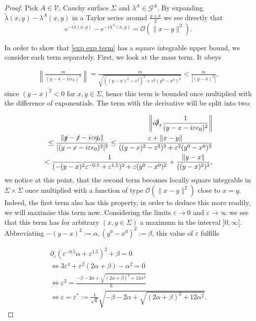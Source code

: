 \documentclass[b5paper,draft,openbib,12pt]{memoir}
\begin{document}
\begin{proof}
Pick \(A\in \mathcal{V}\), Cauchy surface \(\Sigma\) and \(\lambda^A\in \mathcal{G}^A\).
By expanding \(\tilde{\lambda}(x,y)-\lambda^A(x,y)\) in a Taylor series around \(\frac{y+x}{2}\) we see directly that
\begin{equation}\label{exp exp diff}
e^{-i\tilde{\lambda}(x,y)}-e^{-i\lambda^A(x,y)}=\mathcal{O}(\|x-y\|^2).
\end{equation}

In order to show that \eqref{exp exp term} has a square integrable upper bound, we consider each term separately.  First, we look at the mass term. 
It obeys

\begin{align}
\left\|\frac{m}{(y-x-i\varepsilon e_0)^2}\right\|= \frac{m}{\sqrt{((y-x)^2-\varepsilon^2)^2+\varepsilon^2(y^0-x^0)^2}}<\frac{m}{|(y-x)^2|},
\end{align}
since \((y-x)^2<0\) for \(x,y\in \Sigma\), hence this 
term is bounded once multiplied with the difference of 
exponentials.
The term with the derivative will be split into two:

\begin{align}
\left\| i\slashed{\partial}_x \frac{1}{(y-x-i\varepsilon e_0)^2} \right\|\\
\le \frac{\| \slashed{y}-\slashed{x}-i\varepsilon \slashed{e_0}\|}{| (y-x-i\varepsilon e_0)^2|^2}
\le \frac{\varepsilon + \|x-y\|}{((y-x)^2-\varepsilon^2)^2+\varepsilon^2 (y^0-x^0)^2}\\\label{eq:uglyterm}
<\frac{1}{(-(y-x)^2 \varepsilon^{-0.5}+\varepsilon^{1.5})^2+\varepsilon(y^0-x^0)^2} +\frac{\|y-x\|}{((y-x)^2)^2},
\end{align}
we notice at this point, that the second term becomes locally square integrable in \(\Sigma\times\Sigma\) 
once multiplied with a function of type \(\mathcal{O}(\|x-y\|^2)\) close to \(x=y\). Indeed, the first term also has this property, in order to
deduce this more readily, we will maximise this term now.  Considering the limits \(\varepsilon \rightarrow 0\) and \(\varepsilon \rightarrow \infty\)
we see that this term has for arbitrary \((x,y\in\Sigma)\) a maximum in the interval \(]0,\infty[\). 
Abbreviating \(-(y-x)^2:=\alpha, (y^0-x^0)^2:=\beta\), this value of \(\varepsilon\) fulfills

\begin{align}
\partial_\varepsilon ( \varepsilon^{-0.5}\alpha + \varepsilon^{1.5})^2+\beta=0\\
\iff 3 \varepsilon^4 + \varepsilon^2(2 \alpha+\beta)-\alpha^2=0\\
\iff \varepsilon^2= \frac{-\beta-2\alpha + \sqrt{(2\alpha + \beta)^2+12 \alpha^2}}{6}\\
\iff \varepsilon=\varepsilon^* :=\frac{1}{\sqrt{6}} \sqrt{-\beta-2\alpha + \sqrt{(2\alpha + \beta)^2+12 \alpha^2}}.
\end{align}


\end{proof}
\end{document}
